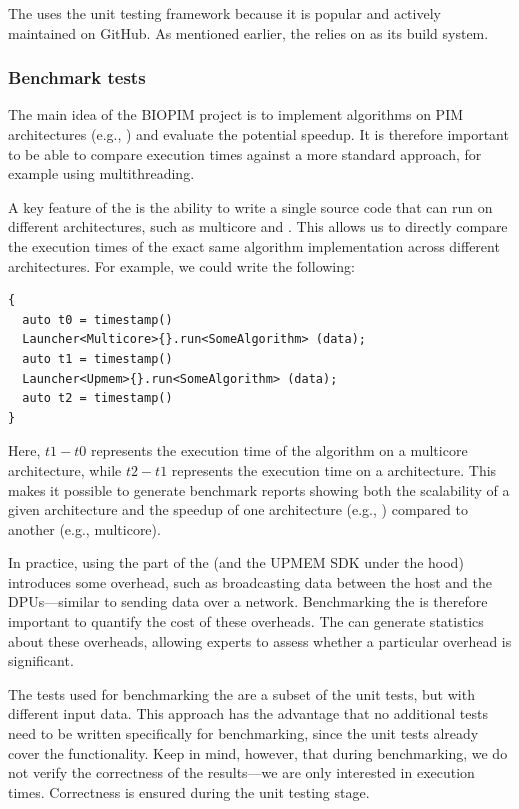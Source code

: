 The \BPL uses the  unit testing framework because it is popular and actively maintained on GitHub. As mentioned earlier, the \BPL relies on  as its build system.

\subsubsection{Benchmark tests}

The main idea of the BIOPIM project is to implement algorithms on PIM architectures (e.g., \UPMEM) and evaluate the potential speedup.
It is therefore important to be able to compare execution times against a more standard approach, for example using multithreading.

A key feature of the \BPL is the ability to write a single source code that can run on different architectures, such as multicore and \UPMEM.
This allows us to directly compare the execution times of the exact same algorithm implementation across different architectures.
For example, we could write the following:

\begin{verbatim}
{
  auto t0 = timestamp()
  Launcher<Multicore>{}.run<SomeAlgorithm> (data);
  auto t1 = timestamp()
  Launcher<Upmem>{}.run<SomeAlgorithm> (data);
  auto t2 = timestamp()
}
\end{verbatim}

Here, $t1 - t0$ represents the execution time of the algorithm on a multicore architecture, while $t2 - t1$ represents the execution time on a \UPMEM architecture. This makes it possible to generate benchmark reports showing both the scalability of a given architecture and the speedup of one architecture (e.g., \UPMEM) compared to another (e.g., multicore).

In practice, using the \UPMEM part of the \BPL (and the UPMEM SDK under the hood) introduces some overhead, such as broadcasting data between the host and the DPUs—similar to sending data over a network. Benchmarking the \BPL is therefore important to quantify the cost of these overheads. The \BPL can generate statistics about these overheads, allowing experts to assess whether a particular overhead is significant.

The tests used for benchmarking the \BPL are a subset of the unit tests, but with different input data. This approach has the advantage that no additional tests need to be written specifically for benchmarking, since the unit tests already cover the functionality. Keep in mind, however, that during benchmarking, we do not verify the correctness of the results—we are only interested in execution times. Correctness is ensured during the unit testing stage.

